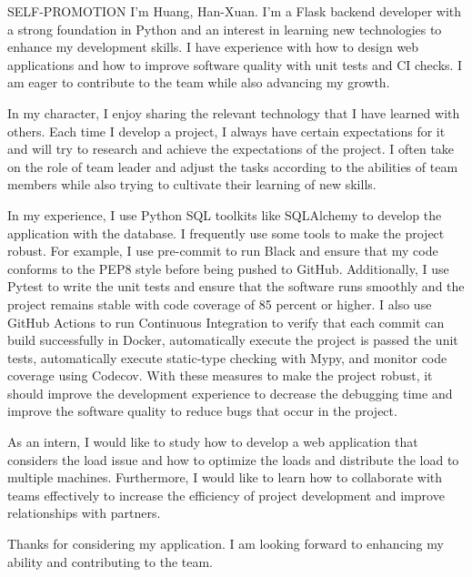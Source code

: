 \documentclass{resume} %
\begin{document}
\begin{rSection}{SELF-PROMOTION}
    I'm Huang, Han-Xuan. I'm a Flask backend developer with a strong foundation in Python and an interest in learning new technologies to enhance my development skills. I have experience with how to design web applications and how to improve software quality with unit tests and CI checks. I am eager to contribute to the team while also advancing my growth. 

    In my character, I enjoy sharing the relevant technology that I have learned with others. Each time I develop a project, I always have certain expectations for it and will try to research and achieve the expectations of the project. I often take on the role of team leader and adjust the tasks according to the abilities of team members while also trying to cultivate their learning of new skills.

    In my experience, I use Python SQL toolkits like SQLAlchemy to develop the application with the database. I frequently use some tools to make the project robust. For example, I use pre-commit to run Black and ensure that my code conforms to the PEP8 style before being pushed to GitHub. Additionally, I use Pytest to write the unit tests and ensure that the software runs smoothly and the project remains stable with code coverage of 85 percent or higher. I also use GitHub Actions to run Continuous Integration to verify that each commit can build successfully in Docker, automatically execute the project is passed the unit tests, automatically execute static-type checking with Mypy, and monitor code coverage using Codecov. With these measures to make the project robust, it should improve the development experience to decrease the debugging time and improve the software quality to reduce bugs that occur in the project.

    As an intern, I would like to study how to develop a web application that considers the load issue and how to optimize the loads and distribute the load to multiple machines. Furthermore, I would like to learn how to collaborate with teams effectively to increase the efficiency of project development and improve relationships with partners.

    Thanks for considering my application. I am looking forward to enhancing my ability and contributing to the team.
\end{rSection}
\end{document}
